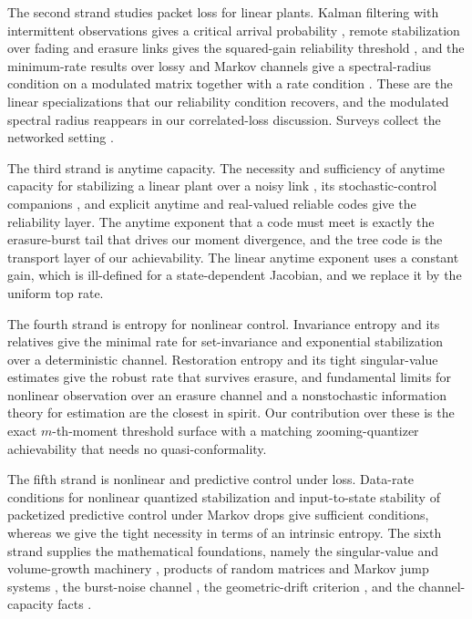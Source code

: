 \documentclass[journal]{IEEEtran}
\theoremstyle{definition}
\theoremstyle{remark}
\begin{document}
The second strand studies packet loss for linear plants. Kalman filtering with intermittent observations gives a
critical arrival probability \cite{sinopoli2004}, remote stabilization over fading and erasure links gives the
squared-gain reliability threshold \cite{elia2005,gupta2007}, and the minimum-rate results over lossy and Markov
channels give a spectral-radius condition on a modulated matrix together with a rate condition
\cite{youxie2010,minero2009,coviello2013}. These are the linear specializations that our reliability condition
recovers, and the modulated spectral radius reappears in our correlated-loss discussion. Surveys collect the
networked setting \cite{schenato2007,hespanha2007}.

The third strand is anytime capacity. The necessity and sufficiency of anytime capacity for stabilizing a linear
plant over a noisy link \cite{sahaimitter2006}, its stochastic-control companions
\cite{tsm2004,simsek2004,freudenberg2010,martins2006}, and explicit anytime and real-valued reliable codes
\cite{sukhavasi2016,como2010} give the reliability layer. The anytime exponent that a code must meet is exactly
the erasure-burst tail that drives our moment divergence, and the tree code is the transport layer of our
achievability. The linear anytime exponent uses a constant gain, which is ill-defined for a state-dependent
Jacobian, and we replace it by the uniform top rate.

The fourth strand is entropy for nonlinear control. Invariance entropy and its relatives
\cite{coloniuskawan2009,colonius2012,kawan2013,kawan2018,savkin2006,pogromsky2011} give the minimal rate for
set-invariance and exponential stabilization over a deterministic channel. Restoration entropy and its tight
singular-value estimates \cite{matveevpogromsky2016,matveevpogromsky2019} give the robust rate that survives
erasure, and fundamental limits for nonlinear observation over an erasure channel and a nonstochastic information
theory for estimation \cite{diwadkarvaidya2013,nair2013} are the closest in spirit. Our contribution over these
is the exact $m$-th-moment threshold surface with a matching zooming-quantizer achievability that needs no
quasi-conformality.

The fifth strand is nonlinear and predictive control under loss. Data-rate conditions for nonlinear quantized
stabilization \cite{liberzonhespanha2005,baillieul2004,liberzonnair2007,baillieulantsaklis2007} and input-to-state
stability of packetized predictive control under Markov drops \cite{quevedonesic2012} give sufficient conditions,
whereas we give the tight necessity in terms of an intrinsic entropy. The sixth strand supplies the mathematical
foundations, namely the singular-value and volume-growth machinery
\cite{katokhasselblatt1995,walters1982,pesin1977,oseledets1968}, products of random matrices and Markov jump
systems \cite{furstenbergkesten1960,costafragoso2005,fangloparo2002}, the burst-noise channel
\cite{gilbert1960,elliott1963}, the geometric-drift criterion \cite{meyntweedie2009}, and the channel-capacity
facts \cite{shannon1948,coverthomas2006d2,yuksel2010,kawan2018lyap}.
\end{document}
